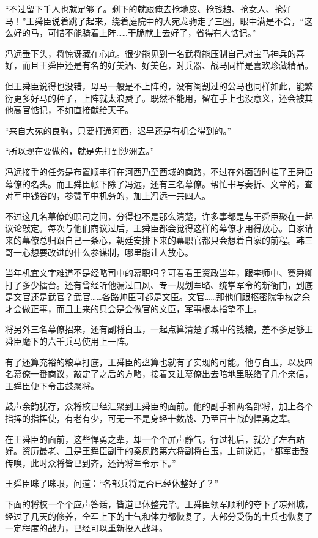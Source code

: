 “不过留下千人也就足够了。剩下的就跟俺去抢地皮、抢钱粮、抢女人、抢好马！”王舜臣说着跳了起来，绕着庭院中的大宛龙驹走了三圈，眼中满是不舍，“这么好的马，可惜不能骑着上阵……干脆献上去好了，省得有人惦记。”

冯远垂下头，将惊讶藏在心底。很少能见到一名武将能压制自己对宝马神兵的喜好，而且王舜臣还是有名的好美酒、好美色，对兵器、战马同样是喜欢珍藏精品。

但王舜臣说得也没错，母马一般是不上阵的，没有阉割过的公马也同样如此，能繁衍更多好马的种子，上阵就太浪费了。既然不能用，留在手上也没意义，还会被其他高官惦记，不如直接献给天子。

“来自大宛的良驹，只要打通河西，迟早还是有机会得到的。”

“所以现在要做的，就是先打到沙洲去。”

冯远接手的任务是布置顺丰行在河西乃至西域的商路，不过在外面暂时挂了王舜臣幕僚的名头。而王舜臣帐下除了冯远，还有三名幕僚。帮忙书写奏折、文章的，查对军中钱谷的，参赞军中机务的，加上冯远一共四人。

不过这几名幕僚的职司之间，分得也不是那么清楚，许多事都是与王舜臣聚在一起议论敲定。每次与他们商议过后，王舜臣都会觉得这样的幕僚才用得放心。自家请来的幕僚总归跟自己一条心，朝廷安排下来的幕职官都只会想着自家的前程。韩三哥一心想要改进的什么参谋制，哪里能让人放心。

当年机宜文字难道不是经略司中的幕职吗？可看看王资政当年，跟李师中、窦舜卿打了多少擂台。还有曾经听他漏过口风、专一规划军略、统掌军令的新衙门，到底是文官还是武官？武官……各路帅臣可都是文臣。文官……那他们跟枢密院争权之余才会做正事，而且上来的只会是会做官的文臣，军事根本指望不上。

将另外三名幕僚招来，还有副将白玉，一起点算清楚了城中的钱粮，差不多足够王舜臣麾下的六千兵马使用上一阵。

有了还算充裕的粮草打底，王舜臣的盘算也就有了实现的可能。他与白玉，以及四名幕僚一番商议，敲定了之后的方略，接着又让幕僚出去暗地里联络了几个亲信，王舜臣便下令击鼓聚将。

鼓声余韵犹存，众将校已经汇聚到王舜臣的面前。他的副手和两名部将，加上各个指挥的指挥使，有老有少，可无一不是身经十数战、乃至百十战的悍勇之辈。

在王舜臣的面前，这些悍勇之辈，却一个个屏声静气，行过礼后，就分了左右站好。资历最老、且是王舜臣副手的秦凤路第六将副将白玉，上前说话，“都军击鼓传唤，此时众将皆已到齐，还请将军令示下。”

王舜臣眯了眯眼，问道：“各部兵将是否已经休整好了？”

下面的将校一个个应声答话，皆道已休整完毕。王舜臣领军顺利的夺下了凉州城，经过了几天的修养，全军上下的士气和体力都恢复了，大部分受伤的士兵也恢复了一定程度的战力，已经可以重新投入战斗。

